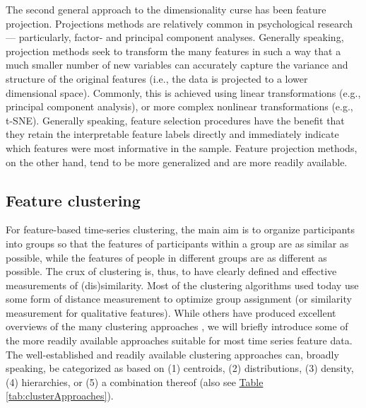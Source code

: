 \documentclass[man, 12pt, a4paper]{apa7}
\theoremstyle{break}
\theoremstyle{plain}
\newcommand{\tblref}[2][]{\hyperref[#2]{Table \ref*{#2}#1}}
\begin{document}
The second general approach to the dimensionality curse has been feature projection. Projections methods are relatively common in psychological research --- particularly, factor- and principal component analyses. Generally speaking, projection methods seek to transform the many features in such a way that a much smaller number of new variables can accurately capture the variance and structure of the original features (i.e., the data is projected to a lower dimensional space). Commonly, this is achieved using linear transformations (e.g., principal component analysis), or more complex nonlinear transformations (e.g., t-SNE). Generally speaking, feature selection procedures have the benefit that they retain the interpretable feature labels directly and immediately indicate which features were most informative in the sample. Feature projection methods, on the other hand, tend to be more generalized and are more readily available.



\subsection{Feature clustering}
For feature-based time-series clustering, the main aim is to organize participants into groups so that the features of participants within a group are as similar as possible, while the features of people in different groups are as different as possible. The crux of clustering is, thus, to have clearly defined and effective measurements of (dis)similarity. Most of the clustering algorithms used today use some form of distance measurement to optimize group assignment (or similarity measurement for qualitative features). While others have produced excellent overviews of the many clustering approaches \citep[e.g.,][]{xu2015}, we will briefly introduce some of the more readily available approaches suitable for most time series feature data. The well-established and readily available clustering approaches can, broadly speaking, be categorized as based on (1) centroids, (2) distributions, (3) density, (4) hierarchies, or (5) a combination thereof (also see \tblref{tab:clusterApproaches}). 
\end{document}
